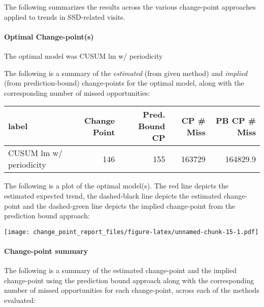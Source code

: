 \documentclass[
]{article}
\begin{document}
The following summarizes the results across the various change-point
approaches applied to trends in SSD-related visits.

\hypertarget{optimal-change-points-1}{%
\paragraph{Optimal Change-point(s)}\label{optimal-change-points-1}}

The optimal model was CUSUM lm w/ periodicity

The following is a summary of the \emph{estimated} (from given method)
and \emph{implied} (from prediction-bound) change-points for the optimal
model, along with the corresponding number of missed opportunities:

\begin{table}
\centering
\begin{tabular}{l|r|r|r|r}
\hline
label & Change Point & Pred. Bound CP & CP \# Miss & PB CP \# Miss\\
\hline
CUSUM lm w/ periodicity & 146 & 155 & 163729 & 164829.9\\
\hline
\end{tabular}
\end{table}

The following is a plot of the optimal model(s). The red line depicts
the estimated expected trend, the dashed-black line depicts the
estimated change-point and the dashed-green line depicts the implied
change-point from the prediction bound approach:

\texttt{[image: change\_point\_report\_files/figure-latex/unnamed-chunk-15-1.pdf]}

\hypertarget{change-point-summary-1}{%
\paragraph{Change-point summary}\label{change-point-summary-1}}

The following is a summary of the estimated change-point and the implied
change-point using the prediction bound approach along with the
corresponding number of missed opportunities for each change-point,
across each of the methods evaluated:
\end{document}
